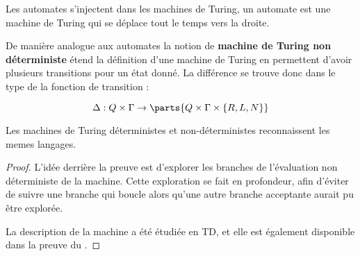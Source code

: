 \begin{remarque}
	Les automates s'injectent dans les machines de Turing, un automate est une machine de Turing qui se déplace tout le temps vers la droite.
\end{remarque}

\begin{definition}
	De manière analogue aux automates la notion de \textbf{machine de Turing non déterministe} étend la définition d'une machine de Turing en
	permettent d'avoir plusieurs transitions pour un état donné. La différence se trouve donc dans le type de la fonction de transition :

	$$ \Delta: Q \times \Gamma \to \parts{Q \times \Gamma \times \{R, L, N\}}$$
\end{definition}

\begin{prop}
	Les machines de Turing déterministes et non-déterministes reconnaissent les memes langages.
\end{prop}

\begin{proof}
	L'idée derrière la preuve est d'explorer les branches de l'évaluation non déterministe de la machine. Cette exploration
	se fait en profondeur, afin d'éviter de suivre une branche qui boucle alors qu'une autre branche acceptante aurait pu être explorée.

	La description de la machine a été étudiée en TD, et elle est également disponible dans la preuve du \cite[Theorem~3.16]{sipser}.
\end{proof}
